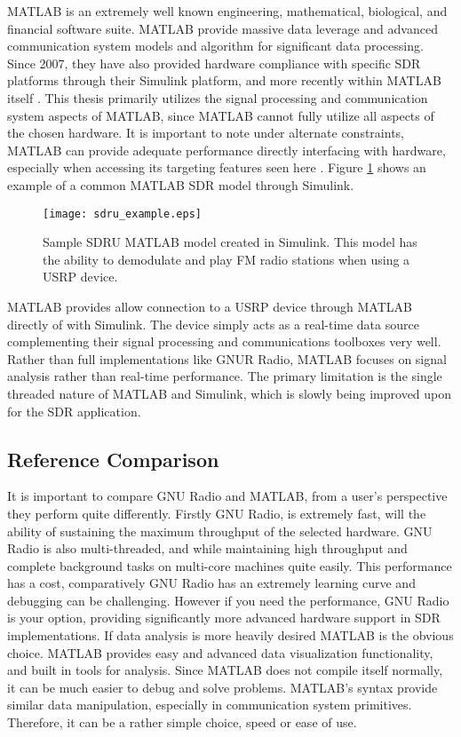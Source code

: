 MATLAB is an extremely well known engineering, mathematical, biological, and financial software suite.  MATLAB provide massive data leverage and advanced communication system models and algorithm for significant data processing.  Since 2007, they have also provided hardware compliance with specific SDR platforms through their Simulink platform, and more recently within MATLAB itself \cite{matlabsdru}.  This thesis primarily utilizes the signal processing and communication system aspects of MATLAB, since MATLAB cannot fully utilize all aspects of the chosen hardware.  It is important to note under alternate constraints, MATLAB can provide adequate performance directly interfacing with hardware, especially when accessing its targeting features seen here \cite{matlabtargeting}.  Figure \ref{sdru_example} shows an example of a common MATLAB SDR model through Simulink.\\

\begin{figure}[!ht]
\centering
\texttt{[image: sdru\_example.eps]}
\caption{Sample SDRU MATLAB model created in Simulink.  This model has the ability to demodulate and play FM radio stations when using a USRP device.}
\label{sdru_example}
\end{figure}

MATLAB provides allow connection to a USRP device through MATLAB directly of with Simulink.  The device simply acts as a real-time data source complementing their signal processing and communications toolboxes very well.  Rather than full implementations like GNUR Radio, MATLAB focuses on signal analysis rather than real-time performance.  The primary limitation is the single threaded nature of MATLAB and Simulink, which is slowly being improved upon for the SDR application.\\

\subsection{Reference Comparison}

It is important to compare GNU Radio and MATLAB, from a user's perspective they perform quite differently.  Firstly GNU Radio, is extremely fast, will the ability of sustaining the maximum throughput of the selected hardware.  GNU Radio is also multi-threaded, and while maintaining high throughput and complete background tasks on multi-core machines quite easily.  This performance has a cost, comparatively GNU Radio has an extremely learning curve and debugging can be challenging.  However if you need the performance, GNU Radio is your option, providing significantly more advanced hardware support in SDR implementations.  If data analysis is more heavily desired MATLAB is the obvious choice.  MATLAB provides easy and advanced data visualization functionality, and built in tools for analysis.  Since MATLAB does not compile itself normally, it can be much easier to debug and solve problems.  MATLAB's syntax provide similar data manipulation, especially in communication system primitives.  Therefore, it can be a rather simple choice, speed or ease of use.\\ 

